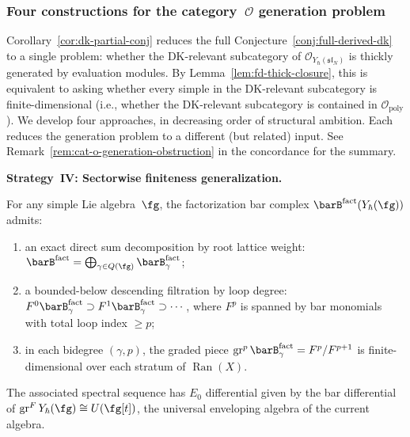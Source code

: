 \subsubsection*{Four constructions for the category~$\mathcal{O}$
generation problem}
\label{sec:cat-O-generation-constructions}

Corollary~\ref{cor:dk-partial-conj} reduces the full
Conjecture~\ref{conj:full-derived-dk} to a single problem: whether
the DK-relevant subcategory of
$\mathcal{O}_{Y_\hbar(\mathfrak{sl}_N)}$ is thickly generated
by evaluation modules.
By Lemma~\ref{lem:fd-thick-closure}, this is equivalent to asking
whether every simple in the DK-relevant subcategory is
finite-dimensional (i.e., whether the DK-relevant subcategory
is contained in $\mathcal{O}_{\mathrm{poly}}$).
We develop four approaches, in decreasing
order of structural ambition. Each reduces the generation problem to
a different (but related) input. See
Remark~\ref{rem:cat-o-generation-obstruction} in the concordance
for the summary.

\medskip

\noindent\textbf{Strategy~IV\@: Sectorwise finiteness
generalization.}

\begin{proposition}
\label{prop:yangian-bar-loop-weight}
For any simple Lie algebra~$\fg$, the factorization bar complex
$\barB^{\mathrm{fact}}(Y_\hbar(\fg))$ admits:
\begin{enumerate}[label=\textup{(\alph*)}]
\item an exact direct sum decomposition by root lattice weight:
 $\barB^{\mathrm{fact}} = \bigoplus_{\gamma \in
 Q(\fg)} \barB^{\mathrm{fact}}_\gamma$;
\item a bounded-below descending filtration by loop degree:
 $F^0 \barB^{\mathrm{fact}}_\gamma \supset
 F^1 \barB^{\mathrm{fact}}_\gamma \supset \cdots$,
 where $F^p$ is spanned by bar monomials with total loop index
 $\ge p$;
\item in each bidegree $(\gamma, p)$, the graded piece
 $\operatorname{gr}^p \barB^{\mathrm{fact}}_\gamma =
 F^p / F^{p+1}$ is finite-dimensional over each stratum of
 $\operatorname{Ran}(X)$.
\end{enumerate}
The associated spectral sequence has $E_0$ differential given by
the bar differential of
$\operatorname{gr}^F Y_\hbar(\fg) \cong
U(\fg[t])$, the universal enveloping algebra of the
current algebra.
\end{proposition}

